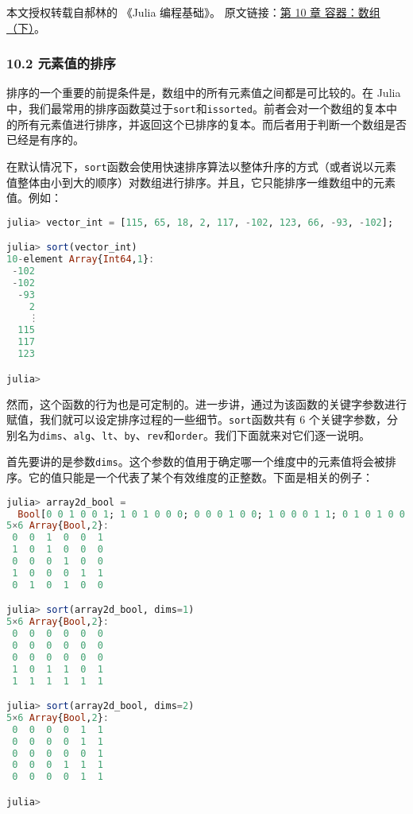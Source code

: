 
本文授权转载自郝林的 《Julia 编程基础》。 原文链接：\href{https://github.com/hyper0x/JuliaBasics/blob/master/book/ch10.md}{第 10 章 容器：数组（下）}。


\subsubsection{10.2 元素值的排序}

排序的一个重要的前提条件是，数组中的所有元素值之间都是可比较的。在 Julia 中，我们最常用的排序函数莫过于\verb|sort|和\verb|issorted|。前者会对一个数组的复本中的所有元素值进行排序，并返回这个已排序的复本。而后者用于判断一个数组是否已经是有序的。

在默认情况下，\verb|sort|函数会使用快速排序算法以整体升序的方式（或者说以元素值整体由小到大的顺序）对数组进行排序。并且，它只能排序一维数组中的元素值。例如：

\begin{lstlisting}[language=julia]
julia> vector_int = [115, 65, 18, 2, 117, -102, 123, 66, -93, -102];

julia> sort(vector_int)
10-element Array{Int64,1}:
 -102
 -102
  -93
    2
    ⋮
  115
  117
  123

julia>
\end{lstlisting}

然而，这个函数的行为也是可定制的。进一步讲，通过为该函数的关键字参数进行赋值，我们就可以设定排序过程的一些细节。\verb|sort|函数共有 6 个关键字参数，分别名为\verb|dims|、\verb|alg|、\verb|lt|、\verb|by|、\verb|rev|和\verb|order|。我们下面就来对它们逐一说明。

首先要讲的是参数\verb|dims|。这个参数的值用于确定哪一个维度中的元素值将会被排序。它的值只能是一个代表了某个有效维度的正整数。下面是相关的例子：

\begin{lstlisting}[language=julia]
julia> array2d_bool = 
  Bool[0 0 1 0 0 1; 1 0 1 0 0 0; 0 0 0 1 0 0; 1 0 0 0 1 1; 0 1 0 1 0 0]
5×6 Array{Bool,2}:
 0  0  1  0  0  1
 1  0  1  0  0  0
 0  0  0  1  0  0
 1  0  0  0  1  1
 0  1  0  1  0  0

julia> sort(array2d_bool, dims=1)
5×6 Array{Bool,2}:
 0  0  0  0  0  0
 0  0  0  0  0  0
 0  0  0  0  0  0
 1  0  1  1  0  1
 1  1  1  1  1  1

julia> sort(array2d_bool, dims=2)
5×6 Array{Bool,2}:
 0  0  0  0  1  1
 0  0  0  0  1  1
 0  0  0  0  0  1
 0  0  0  1  1  1
 0  0  0  0  1  1

julia> 
\end{lstlisting}

